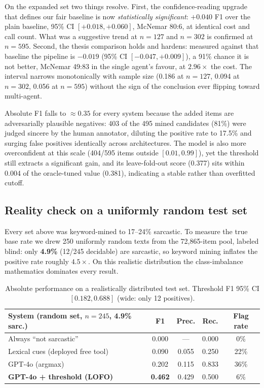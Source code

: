 \documentclass[10pt]{article}
\begin{document}
On the expanded set two things resolve. First, the confidence-reading upgrade that defines our fair
baseline is now \emph{statistically significant}: $+0.040$ F1 over the plain baseline, 95\% CI
$[+0.018, +0.060]$, McNemar 80:6, at identical cost and call count. What was a suggestive trend at
$n=127$ and $n=302$ is confirmed at $n=595$. Second, the thesis comparison holds and hardens:
measured against that baseline the pipeline is $\mathbf{-0.019}$ (95\% CI $[-0.047, +0.009]$), a
91\% chance it is not better, McNemar 49:83 in the single agent's favour, at $2.96\times$ the cost.
The interval narrows monotonically with sample size (0.186 at $n=127$, 0.094 at $n=302$, 0.056 at
$n=595$) without the sign of the conclusion ever flipping toward multi-agent.

Absolute F1 falls to ${\approx}0.35$ for every system because the added items are adversarially
plausible negatives: 403 of the 495 mined candidates (81\%) were judged sincere by the human
annotator, diluting the positive rate to 17.5\% and surging false positives identically across
architectures. The model is also more overconfident at this scale (404/595 items outside
$[0.01, 0.99]$), yet the threshold still extracts a significant gain, and its leave-fold-out score
(0.377) sits within 0.004 of the oracle-tuned value (0.381), indicating a stable rather than
overfitted cutoff.

\subsection{Reality check on a uniformly random test set}
Every set above was keyword-mined to 17--24\% sarcastic. To measure the true base rate we drew 250
uniformly random texts from the 72{,}865-item pool, labeled blind: only \textbf{4.9\%} (12/245
decidable) are sarcastic, so keyword mining inflates the positive rate roughly $4.5\times$. On this
realistic distribution the class-imbalance mathematics dominates every result.

\begin{table}[h]\centering\small
\begin{tabular}{lcccc}
\toprule
System (random set, $n=245$, 4.9\% sarc.) & F1 & Prec. & Rec. & Flag rate \\
\midrule
Always ``not sarcastic'' & 0.000 & --- & 0.000 & 0\% \\
Lexical cues (deployed free tool) & 0.090 & 0.055 & 0.250 & 22\% \\
GPT-4o (argmax) & 0.202 & 0.115 & 0.833 & 36\% \\
\textbf{GPT-4o + threshold (LOFO)} & \textbf{0.462} & 0.429 & 0.500 & 6\% \\
\bottomrule
\end{tabular}
\caption{Absolute performance on a realistically distributed test set. Threshold F1 95\% CI
$[0.182, 0.688]$ (wide: only 12 positives).}
\end{table}
\end{document}
